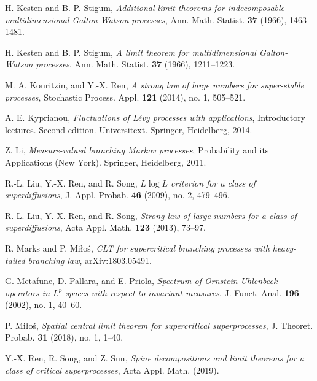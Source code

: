 \documentclass[12pt,a4paper]{amsart}
\theoremstyle{plain}
\theoremstyle{definition}
\numberwithin{equation}{section}
\begin{document}
\begin{thebibliography}{10}
  H. Kesten and B. P. Stigum,
  \emph{Additional limit theorems for indecomposable multidimensional {G}alton-{W}atson processes},
  Ann. Math. Statist. \textbf{37} (1966), 1463--1481.

  H. Kesten and B. P. Stigum,
  \emph{A limit theorem for multidimensional {G}alton-{W}atson processes},
  Ann. Math. Statist. \textbf{37} (1966), 1211--1223.

  M. A. Kouritzin, and Y.-X. Ren,
  \emph{A strong law of large numbers for super-stable processes},
  Stochastic Process. Appl. \textbf{121} (2014), no. 1, 505--521.

  A. E. Kyprianou,
  \emph{Fluctuations of {L}\'{e}vy processes with applications},
  Introductory lectures. Second edition. Universitext. Springer, Heidelberg, 2014.

  Z. Li,
  \emph{Measure-valued branching {M}arkov processes},
  Probability and its Applications (New York). Springer, Heidelberg, 2011.

  R.-L. Liu, Y.-X. Ren, and R. Song,
  \emph{{$L\log L$} criterion for a class of superdiffusions},
  J. Appl. Probab. \textbf{46} (2009), no. 2, 479--496.

  R.-L. Liu, Y.-X. Ren, and R. Song,
  \emph{Strong law of large numbers for a class of superdiffusions},
  Acta Appl. Math. \textbf{123} (2013), 73--97.

  R. Marks and P. Mi{\l}o{\'s},
  \emph{C{LT} for supercritical branching processes with heavy-tailed branching law},
  arXiv:1803.05491.

  G. Metafune, D. Pallara, and E. Priola,
  \emph{Spectrum of {O}rnstein-{U}hlenbeck operators in {$L^p$} spaces with respect to invariant  measures},
  J. Funct. Anal. \textbf{196} (2002), no. 1, 40--60.

  P. Mi{\l}o{\'s},
  \emph{Spatial central limit theorem for supercritical superprocesses},
  J. Theoret. Probab. \textbf{31} (2018), no. 1, 1--40.

  Y.-X. Ren, R. Song, and Z. Sun,
  \emph{Spine decompositions and limit theorems for a class of critical superprocesses},
  Acta Appl. Math. (2019).


\end{thebibliography}
\end{document}
